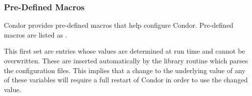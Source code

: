 \subsubsection{\label{sec:Pre-Defined-Macros}Pre-Defined Macros}

Condor provides pre-defined macros that help configure Condor.
Pre-defined macros are listed as .

This first set are entries whose values are determined at
run time and cannot be overwritten.  These are inserted automatically by
the library routine which parses the configuration files.
This implies that a change to the underlying value of any of these
variables will require a full restart of Condor in order to use
the changed value.
